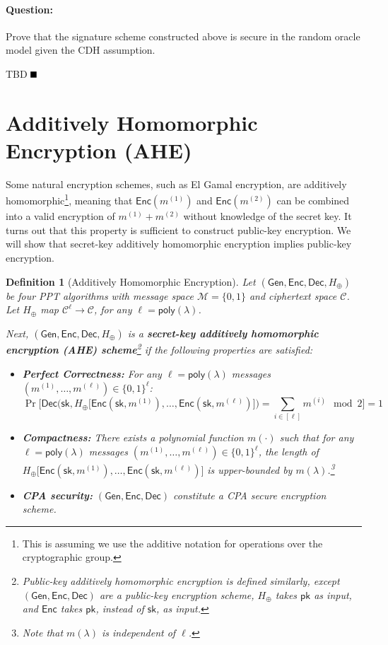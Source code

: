 \documentclass[11pt]{article}
\newtheorem{definition}[theorem]{Definition}
\newenvironment{solution}{\color{blue}\noindent{\bf Solution}\hspace*{1em}}{\qed\medskip}
\newcommand{\qed}{\mbox{}\hspace*{\fill}\nolinebreak\mbox{$\rule{0.6em}{0.6em}$}} %
\numberwithin{equation}{section}
\newcommand{\Gen}{\mathsf{Gen}}
\newcommand{\Enc}{\mathsf{Enc}}
\newcommand{\Dec}{\mathsf{Dec}}
\newcommand{\enc}{\mathsf{Enc}}
\newcommand{\pk}{\mathsf{pk}}
\newcommand{\sk}{\mathsf{sk}}
\newcommand{\secp}{\lambda}
\newcommand{\cC}{\mathcal{C}}
\newcommand{\cM}{\mathcal{M}}
\newcommand{\poly}{\mathsf{poly}}
\newcommand{\bin}{\{0,1\}}
\newcommand{\bit}{\bin}
\begin{document}
\paragraph{Question:} Prove that the signature scheme constructed above is secure in the random oracle model given the CDH assumption.

\vspace{5mm}
\begin{solution}
TBD
\end{solution}


\section{Additively Homomorphic Encryption (AHE)}
Some natural encryption schemes, such as El Gamal encryption, are additively homomorphic\footnote{This is assuming we use the additive notation for operations over the cryptographic group.}, meaning that $\enc(m^{(1)})$ and $\enc(m^{(2)})$ can be combined into a valid encryption of $m^{(1)} + m^{(2)}$ without knowledge of the secret key. It turns out that this property is sufficient to construct public-key encryption. We will show that secret-key additively homomorphic encryption implies public-key encryption.

\begin{definition}[Additively Homomorphic Encryption]\label{def:AHE}
Let $(\Gen, \Enc, \Dec, H_\oplus)$ be four PPT algorithms with message space $\cM = \bit$ and ciphertext space $\cC$. Let $H_\oplus$ map $\cC^{\ell} \to \cC$, for any $\ell = \poly(\secp)$. 

Next, $(\Gen, \Enc, \Dec, H_\oplus)$ is a \textbf{secret-key additively homomorphic encryption (AHE) scheme}\footnote{\textit{Public-key} additively homomorphic encryption is defined similarly, except $(\Gen, \Enc, \Dec)$ are a public-key encryption scheme, $H_\oplus$ takes $\pk$ as input, and $\Enc$ takes $\pk$, instead of $\sk$, as input.} if the following properties are satisfied: 

\begin{itemize}
    \item \textbf{Perfect Correctness:} For any $\ell = \poly(\secp)$ messages $(m^{(1)}, \dots, m^{(\ell)}) \in \bit^\ell$:
    \[\Pr\bigg[\Dec\Big(\sk, H_\oplus\big[\Enc(\sk, m^{(1)}), \dots, \Enc(\sk, m^{(\ell)})\big]\Big) = \sum_{i \in [\ell]} m^{(i)} \mod 2\bigg] = 1\]
    \item \textbf{Compactness:} There exists a polynomial function $m(\cdot)$ such that for any $\ell = \poly(\secp)$ messages $(m^{(1)}, \dots, m^{(\ell)}) \in \bit^\ell$, the length of $H_\oplus\big[\Enc(\sk, m^{(1)}), \dots, \Enc(\sk, m^{(\ell)})\big]$ is upper-bounded by $m(\secp)$.\footnote{Note that $m(\secp)$ is independent of $\ell$.}
    \item \textbf{CPA security:} $(\Gen, \Enc, \Dec)$ constitute a CPA secure encryption scheme.
\end{itemize}
\end{definition}
\end{document}
